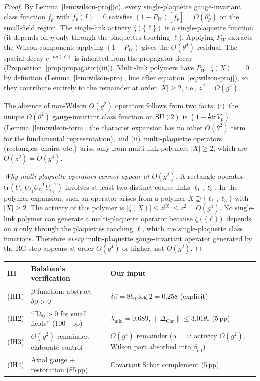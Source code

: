 \documentclass[11pt]{article}
\theoremstyle{definition}
\newcommand{\SU}{\mathrm{SU}}
\newcommand{\tr}{\mathrm{tr}}
\begin{document}
\begin{proof}
By Lemma~\ref{lem:wilson-proj}(c), every single-plaquette
gauge-invariant class function $f_p$ with $f_p(I)=0$ satisfies
$(1-P_W)[f_p]=O(\theta_p^4)$ on the small-field region.
The single-link activity $\zeta(\{\ell\})$ is a
single-plaquette function (it depends on $\eta$ only through
the plaquettes touching $\ell$).
Applying $P_W$ extracts the Wilson component; applying
$(1-P_W)$ gives the $O(\theta^4)$ residual.
The spatial decay $e^{-\kappa d(\ell)}$ is inherited from
the propagator decay
(Proposition~\ref{prop:propagator}(iii)).
Multi-link polymers have $P_W[\zeta(X)]=0$ by definition
(Lemma~\ref{lem:wilson-proj}, line after
equation~\eqref{eq:wilson-proj}), so they contribute
entirely to the remainder at order $|X|\ge 2$, i.e.,
$z^2=O(g^4)$.

The absence of non-Wilson $O(g^2)$ operators follows from
two facts: (i)~the unique $O(\theta^2)$ gauge-invariant
class function on $\SU(2)$ is $(1-\frac{1}{2}\tr V_p)$
(Lemma~\ref{lem:wilson-form}: the character expansion
has no other $O(\theta^2)$ term for the fundamental
representation), and (ii)~multi-plaquette operators
(rectangles, chairs, etc.)\ arise only from multi-link
polymers $|X|\ge 2$, which are $O(z^2)=O(g^4)$.

\emph{Why multi-plaquette operators cannot appear at $O(g^2)$.}
A rectangle operator $\tr(U_{\ell_1}U_{\ell_2}U_{\ell_3}^{-1}
U_{\ell_4}^{-1})$ involves at least two distinct coarse links
$\ell_1,\ell_3$.  In the polymer expansion, such an operator
arises from a polymer $X\supseteq\{\ell_1,\ell_3\}$ with
$|X|\ge 2$.  The activity of this polymer is
$|\zeta(X)|\le z^{|X|}\le z^2=O(g^4)$.
No single-link polymer can generate a multi-plaquette operator
because $\zeta(\{\ell\})$ depends on $\eta$ only through
the plaquettes touching $\ell$, which are single-plaquette
class functions.  Therefore \emph{every} multi-plaquette
gauge-invariant operator generated by the RG step
appears at order $O(g^4)$ or higher, not $O(g^2)$.
\end{proof}

\begin{center}
\begin{tabular}{lp{5cm}p{5cm}}
\toprule
\textbf{IH} & \textbf{Balaban's verification} & \textbf{Our input}\\
\midrule
(IH1) & $\beta$-function: abstract $\delta\beta>0$ &
$\delta\beta=8b_0\log 2=0.258$ (explicit)\\
(IH2) & ``$\exists\lambda_0>0$ for small fields'' (100+\,pp) &
$\lambda_{\min}=0.689$, $\|\Delta_{\mathrm{Chr}}\|\le 3.01\theta_*$ (5\,pp)\\
(IH3) & $O(g^2)$ remainder, elaborate control &
$O(g^4)$ remainder ($\alpha=1$: activity $O(g^2)$, Wilson part absorbed into $\beta_{\mathrm{eff}}$)\\
(IH4) & Axial gauge $+$ restoration (85\,pp) &
Covariant Schur complement (5\,pp)\\
\bottomrule
\end{tabular}
\end{center}
\end{document}
